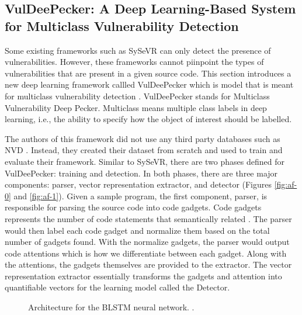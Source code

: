 \documentclass[12pt,twocolumn,letterpaper]{article}
\begin{document}
\subsection{VulDeePecker: A Deep Learning-Based System for Multiclass Vulnerability Detection}
\label{sub:vuledeepecker}

Some existing frameworks such as SySeVR can only detect the presence of vulnerabilities. However, these 
frameworks cannot piinpoint the types of vulnerabilities that are present in a given source code. This 
section introduces a new deep learning framework callled VulDeePecker which is model that is meant for 
multiclass vulnerability detection \cite{Zou21}.  VulDeePecker stands for Multiclass Vulnerability Deep Pecker.
Multiclass means multiple class labels in deep learning, i.e., the ability to specify how the object of interest 
should be labelled.

The authors of this framework did not use any third party databases such as NVD \cite{Nist00,Zou21}. Instead, 
they created their dataset from scratch and used to train and evaluate their framework. Similar to SySeVR, 
there are two phases defined for VulDeePecker: training and detection. In both phases, there are three major
components: parser, vector representation extractor, and detector (Figures \ref{fig:af-0} and \ref{fig:af-1}). 
Given a sample program, the first component, parser, is responsible for parsing the source code into code gadgets. 
Code gadgets represents the number of code statements that semantically related \cite{Zou21}. The parser would then 
label each code gadget and normalize them based on the total number of gadgets found. With the normalize gadgets, 
the parser would output code attentions which is how we differentiate between each gadget. Along with the attentions,
the gadgets themselves are provided to the extractor. The vector representation extractor essentially transforms the 
gadgets and attention into quantifiable vectors for the learning model called the Detector. 

\begin{figure}[h]
    \centering

    \caption{Architecture for the BLSTM neural network. \cite{Zou21}.}
    \label{fig:af-2}
\end{figure}
\end{document}
